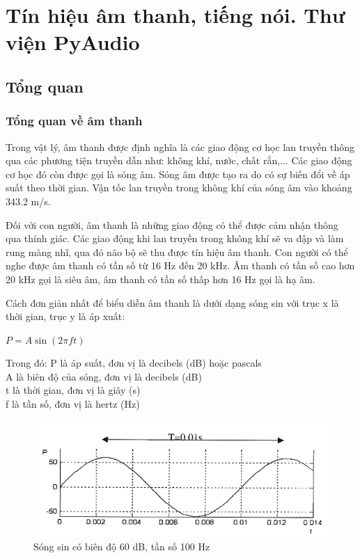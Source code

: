 \chapter{Tín hiệu âm thanh, tiếng nói. Thư viện PyAudio}
\ifpdf
    \graphicspath{{Chapter2/Chapter2Figs/PNG/}{Chapter2/Chapter2Figs/PDF/}{Chapter2/Chapter2Figs/}}
\else
    \graphicspath{{Chapter2/Chapter2Figs/EPS/}{Chapter2/Chapter2Figs/}}
\fi

\section{Tổng quan}
\subsection{Tổng quan về âm thanh}
Trong vật lý, âm thanh được định nghĩa là các giao động cơ học lan truyền thông qua các phương tiện truyền dẫn như: không khí, nước, chất rắn,... Các giao động cơ học đó còn được gọi là sóng âm. Sóng âm được tạo ra do có sự biến đổi về áp suất theo thời gian. Vận tốc lan truyền trong không khí của sóng âm vào khoảng 343.2 m/s.

Đối với con người, âm thanh là những giao động có thể được cảm nhận thông qua thính giác. Các giao động khi lan truyền trong không khí sẽ va đập và làm rung màng nhĩ, qua đó não bộ sẽ thu được tín hiệu âm thanh. Con người có thể nghe được âm thanh có tần số từ 16 Hz đến 20 kHz. Âm thanh có tần số cao hơn 20 kHz gọi là siêu âm, âm thanh có tần số thấp hơn 16 Hz gọi là hạ âm.

Cách đơn giản nhất để biểu diễn âm thanh là dưới dạng sóng sin với trục x là thời gian, trục y là áp xuất:

\begin{center}
$P = A\sin (2\pi ft)$
\end{center}

Trong đó: P là áp suất, đơn vị là decibels (dB) hoặc pascals \\
A là biên độ của sóng, đơn vị là decibels (dB) \\
t là thời gian, đơn vị là giây (s) \\
f là tần số, đơn vị là hertz (Hz)

\begin{figure}[h]
    \centering
    \includegraphics[scale=1]{sinwave}
    \caption{Sóng sin có biên độ 60 dB, tần số 100 Hz}
    \label{fig:c2_sinwave}
\end{figure}

